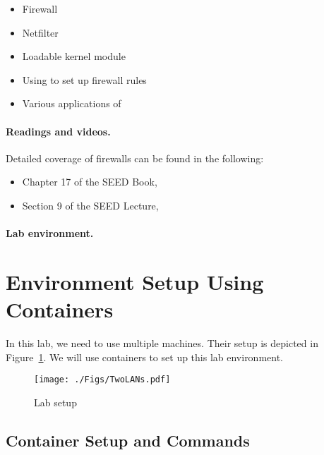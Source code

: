 \begin{itemize}[noitemsep]
\item Firewall
\item Netfilter
\item Loadable kernel module
\item Using \iptables to set up firewall rules
\item Various applications of \iptables
\end{itemize}


\paragraph{Readings and videos.}
Detailed coverage of firewalls can be found in the following:

\begin{itemize}
\item Chapter 17 of the SEED Book, \seedbook
\item Section 9 of the SEED Lecture, \seedisvideo
\end{itemize}


\paragraph{Lab environment.} \seedenvironmentB




\section{Environment Setup Using Containers}


In this lab, we need to use multiple machines. 
Their setup is depicted in Figure~\ref{fig:labsetup}.  
We will use containers to set up this lab environment.


\begin{figure}[htb]
\begin{center}
\texttt{[image: ./Figs/TwoLANs.pdf]}
\end{center}
\caption{Lab setup}
\label{fig:labsetup}
\end{figure}


\subsection{Container Setup and Commands}




